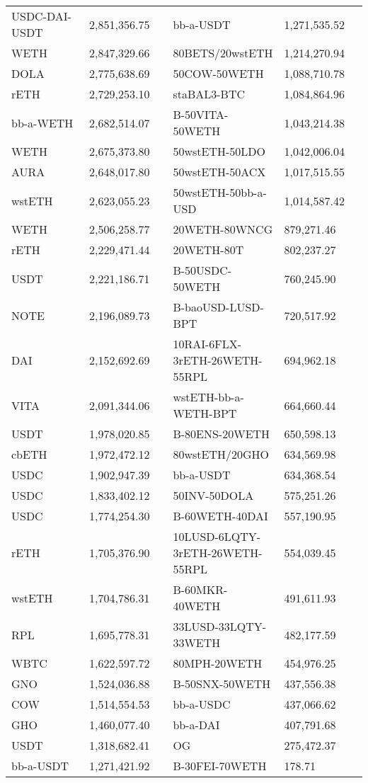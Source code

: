 \begin{longtable}{@{}p{0.25\linewidth}p{0.25\linewidth}p{0.25\linewidth}p{0.25\linewidth}@{}}
USDC-DAI-USDT & 2,851,356.75 & bb-a-USDT &1,271,535.52 \\
WETH & 2,847,329.66 & 80BETS/20wstETH &1,214,270.94 \\
DOLA & 2,775,638.69 & 50COW-50WETH &1,088,710.78 \\
rETH & 2,729,253.10 & staBAL3-BTC &1,084,864.96 \\
bb-a-WETH & 2,682,514.07 & B-50VITA-50WETH &1,043,214.38 \\
WETH & 2,675,373.80 & 50wstETH-50LDO &1,042,006.04 \\
AURA & 2,648,017.80 & 50wstETH-50ACX &1,017,515.55 \\
wstETH & 2,623,055.23 & 50wstETH-50bb-a-USD &1,014,587.42 \\
WETH & 2,506,258.77 & 20WETH-80WNCG &879,271.46 \\
rETH & 2,229,471.44 & 20WETH-80T &802,237.27 \\
USDT & 2,221,186.71 & B-50USDC-50WETH &760,245.90 \\
NOTE & 2,196,089.73 & B-baoUSD-LUSD-BPT &720,517.92 \\
DAI & 2,152,692.69 & 10RAI-6FLX-3rETH-26WETH-55RPL &694,962.18 \\
VITA & 2,091,344.06 & wstETH-bb-a-WETH-BPT &664,660.44 \\
USDT & 1,978,020.85 & B-80ENS-20WETH &650,598.13 \\
cbETH & 1,972,472.12 & 80wstETH/20GHO &634,569.98 \\
USDC & 1,902,947.39 & bb-a-USDT &634,368.54 \\
USDC & 1,833,402.12 & 50INV-50DOLA &575,251.26 \\
USDC & 1,774,254.30 & B-60WETH-40DAI &557,190.95 \\
rETH & 1,705,376.90 & 10LUSD-6LQTY-3rETH-26WETH-55RPL &554,039.45 \\
wstETH & 1,704,786.31 & B-60MKR-40WETH &491,611.93 \\
RPL & 1,695,778.31 & 33LUSD-33LQTY-33WETH &482,177.59 \\
WBTC & 1,622,597.72 & 80MPH-20WETH &454,976.25 \\
GNO & 1,524,036.88 & B-50SNX-50WETH &437,556.38 \\
COW & 1,514,554.53 & bb-a-USDC &437,066.62 \\
GHO & 1,460,077.40 & bb-a-DAI &407,791.68 \\
USDT & 1,318,682.41 & OG &275,472.37 \\
bb-a-USDT & 1,271,421.92 & B-30FEI-70WETH &178.71 \\

\end{longtable}

